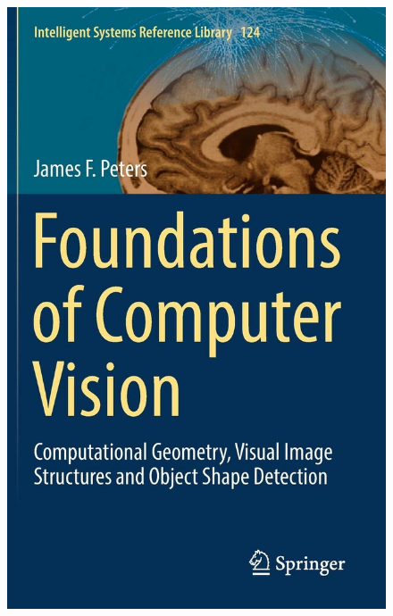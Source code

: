 \documentclass[a4paper,titlepaget]{article}
\begin{document}
\begin{figure}[htpb]
\begin{minipage}{.2\textwidth}
\includegraphics[width=\textwidth, height=0.2\textheight]{images/obj2}
\end{minipage}  
\hspace{.05\textwidth}
\begin{minipage}{.2\textwidth}  

\end{minipage}
\end{figure}
\end{document}
